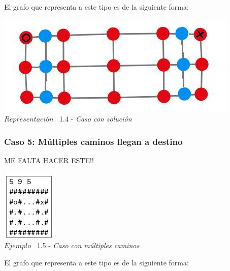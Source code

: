 El grafo que representa a este tipo es de la siguiente forma:\\

\vspace*{0.3cm} \vspace*{0.3cm}
  \begin{center}
 \includegraphics[scale=0.5]{./EJ1/ej1graforandom.jpeg}
 \\{$Representación$ \ 1.4 - \textit{Caso con solución}}
  \end{center}
  \vspace*{0.3cm}

\begin{center}
  \subsubsection*{Caso 5: M\'ultiples caminos llegan a destino}
\end{center}

ME FALTA HACER ESTE!!
\vspace*{0.3cm} \vspace*{0.3cm}
  \begin{center}
 \includegraphics[scale=1.6]{./EJ1/ej1random.jpeg}
\\ {$Ejemplo$ \ 1.5 - \textit{Caso con m\'ultiples caminos}}
  \end{center}
  \vspace*{0.3cm}

El grafo que representa a este tipo es de la siguiente forma:\\

